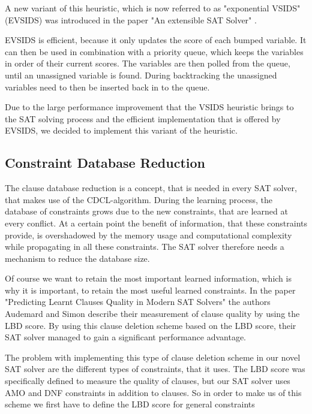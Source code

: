 A new variant of this heuristic, which is now referred to as "exponential VSIDS" (EVSIDS) \cite{biere2015evaluating} was introduced in the paper "An extensible SAT Solver" \cite{een2003extensible}. 

EVSIDS is efficient, because it only updates the score of each bumped variable. It can then be used in combination with a priority queue, which keeps the variables in order of their current scores. The variables are then polled from the queue, until an unassigned variable is found. During backtracking the unassigned variables need to then be inserted back in to the queue. \cite{biere2015evaluating}

Due to the large performance improvement that the VSIDS heuristic brings to the SAT solving process and the efficient implementation that is offered by EVSIDS, we decided to implement this variant of the heuristic.

\subsection{Constraint Database Reduction}

The clause database reduction is a concept, that is needed in every SAT solver, that makes use of the CDCL-algorithm. During the learning process, the database of constraints grows due to the new constraints, that are learned at every conflict. At a certain point the benefit of information, that these constraints provide, is overshadowed by the memory usage and computational complexity while propagating in all these constraints. The SAT solver therefore needs a mechanism to reduce the database size. \cite{biere2009handbook}

Of course we want to retain the most important learned information, which is why it is important, to retain the most useful learned constraints. In the paper "Predicting Learnt Clauses Quality in Modern SAT Solvers" \cite{audemard2009predicting} the authors Audemard and Simon describe their measurement of clause quality by using the LBD score. By using this clause deletion scheme based on the LBD score, their SAT solver managed to gain a significant performance advantage.

The problem with implementing this type of clause deletion scheme in our novel SAT solver are the different types of constraints, that it uses. The LBD score was specifically defined to measure the quality of clauses, but our SAT solver uses AMO and DNF constraints in addition to clauses. So in order to make us of this scheme we first have to define the LBD score for general constraints

